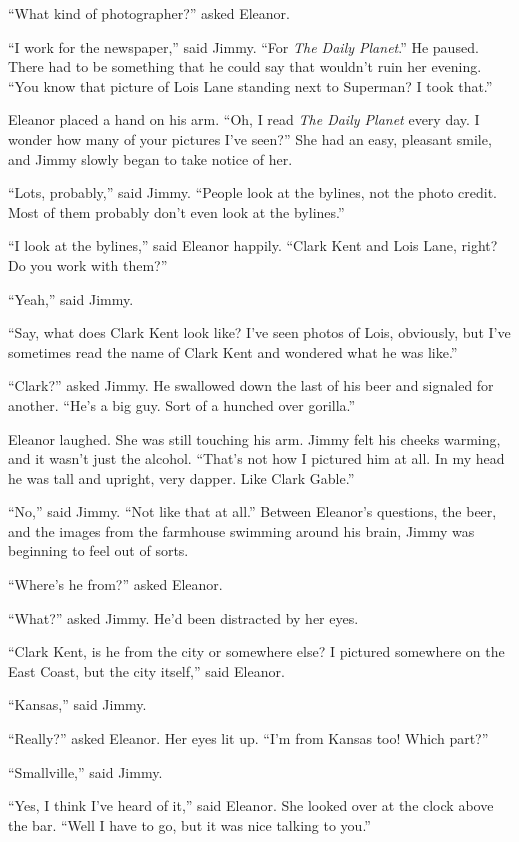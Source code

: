 \documentclass[ebook,12pt]{memoir}
\begin{document}
``What kind of photographer?'' asked Eleanor.

``I work for the newspaper,'' said Jimmy. ``For \emph{The Daily
Planet}.'' He paused. There had to be something that he could say that
wouldn't ruin her evening. ``You know that picture of Lois Lane standing
next to Superman? I took that.''

Eleanor placed a hand on his arm. ``Oh, I read \emph{The Daily Planet}
every day. I wonder how many of your pictures I've seen?'' She had an
easy, pleasant smile, and Jimmy slowly began to take notice of her.

``Lots, probably,'' said Jimmy. ``People look at the bylines, not the
photo credit. Most of them probably don't even look at the bylines.''

``I look at the bylines,'' said Eleanor happily. ``Clark Kent and Lois
Lane, right? Do you work with them?''

``Yeah,'' said Jimmy.

``Say, what does Clark Kent look like? I've seen photos of Lois,
obviously, but I've sometimes read the name of Clark Kent and wondered
what he was like.''

``Clark?'' asked Jimmy. He swallowed down the last of his beer and
signaled for another. ``He's a big guy. Sort of a hunched over
gorilla.''

Eleanor laughed. She was still touching his arm. Jimmy felt his cheeks
warming, and it wasn't just the alcohol. ``That's not how I pictured him
at all. In my head he was tall and upright, very dapper. Like Clark
Gable.''

``No,'' said Jimmy. ``Not like that at all.'' Between Eleanor's
questions, the beer, and the images from the farmhouse swimming around
his brain, Jimmy was beginning to feel out of sorts.

``Where's he from?'' asked Eleanor.

``What?'' asked Jimmy. He'd been distracted by her eyes.

``Clark Kent, is he from the city or somewhere else? I pictured
somewhere on the East Coast, but the city itself,'' said Eleanor.

``Kansas,'' said Jimmy.

``Really?'' asked Eleanor. Her eyes lit up. ``I'm from Kansas too! Which
part?''

``Smallville,'' said Jimmy.

``Yes, I think I've heard of it,'' said Eleanor. She looked over at the
clock above the bar. ``Well I have to go, but it was nice talking to
you.''
\end{document}
